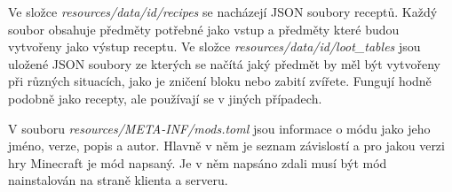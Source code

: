 \documentclass[FM,Proj,bw]{tulthesis}
\begin{document}
\par Ve složce \textit{resources/data/id/recipes} se nacházejí JSON soubory receptů. Každý soubor obsahuje předměty potřebné jako vstup a předměty které budou vytvořeny jako výstup receptu.
Ve složce \textit{resources/data/id/loot\_tables} jsou uložené JSON soubory ze kterých se načítá jaký předmět by měl být vytvořeny při různých situacích, jako je zničení bloku nebo zabití zvířete. Fungují hodně podobně jako recepty, ale používají se v jiných případech.
\par V souboru \textit{resources/META-INF/mods.toml} jsou informace o módu jako jeho jméno, verze, popis a autor. Hlavně v něm je seznam závislostí a pro jakou verzi hry Minecraft je mód napsaný. Je v něm napsáno zdali musí být mód nainstalován na straně klienta a serveru.  \cite{Forge}
\end{document}
